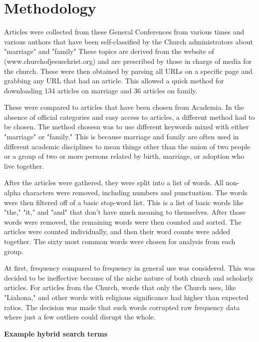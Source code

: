 \documentclass[twocolumn]{article}
\begin{document}
\section{Methodology}
Articles were collected from these General Conferences from various times and various authors that have been self-classified by the Church administrators about "marriage" and "family" These topics are derived from the website of \church (www.churchofjesuschrist.org) and are prescribed by those in charge of media for the church. These were then obtained by parsing all URLs on a specific page and grabbing any URL that had an article. This allowed a quick method for downloading 134 articles on marriage and 36 articles on family.

These were compared to articles that have been chosen from Academia. In the absence of official categories and easy access to articles, a different method had to be chosen. The method chosesn was to use different keywords mixed with either "marriage" or "family." This is because marriage and family are often used in different academic disciplines to mean things other than the union of two people or a group of two or more persons related by birth, marriage, or adoption who live together.

After the articles were gathered, they were split into a list of words. All non-alpha characters were removed, including numbers and punctuation. The words were then filtered off of a basic stop-word list. This is a list of basic words like "the," "it," and "and" that don't have much meaning to themselves. After those words were removed, the remaining words were then counted and sorted. The articles were counted individually, and then their word counts were added together. The sixty most common words were chosen for analysis from each group. 

At first, frequency compared to frequency in general use was considered. This was decided to be ineffective because of the niche nature of both church and scholarly articles. For articles from the Church, words that only the Church uses, like "Liahona," and other words with religious significance had higher than expected ratios. The decision was made that such words corrupted raw frequency data where just a few outliers could disrupt the whole.

\begin{center}
    \parbox{\linewidth}{\centering\textbf{Example hybrid search terms}}
\end{center}
\end{document}
